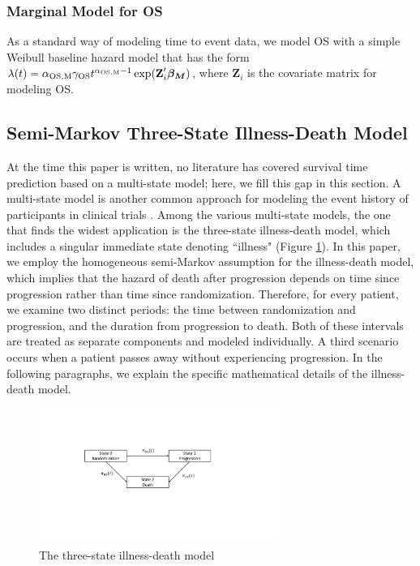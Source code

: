 \subsubsection{Marginal Model for OS} \label{sec:marginal}
As a standard way of modeling time to event data, we model \ac{OS} with a simple Weibull baseline hazard model that has the form
$\lambda(t)=\alpha_{\rm OS,M} \gamma_{\rm OS} t^{\alpha_{\rm OS,M}-1} \exp(\textbf{Z}_i' \boldsymbol{\beta_{M}})$,
where $\textbf{Z}_i$ is the covariate matrix for modeling OS.

\subsection{Semi-Markov Three-State Illness-Death Model}
\label{sec:multi-state}
At the time this paper is written, no literature has covered survival time prediction based on a multi-state model; here, we fill this gap in this section. A multi-state model is another common approach for modeling the event history of participants in clinical trials \citep{andersen2002multi, meira2009multi, putter2007tutorial}. Among the various multi-state models, the one that finds the widest application is the three-state illness-death model, which includes a singular immediate state denoting ``illness" (Figure \ref{fig:multistate}). In this paper, we employ the homogeneous semi-Markov assumption \citep{cox1977theory} for the illness-death model, which implies that the hazard of death after progression depends on time since progression rather than time since randomization. Therefore, for every patient, we examine two distinct periods: the time between randomization and progression, and the duration from progression to death. Both of these intervals are treated as separate components and modeled individually. A third scenario occurs when a patient passes away without experiencing progression. In the following paragraphs, we explain the specific mathematical details of the illness-death model.

\begin{figure}
    \centering
    \includegraphics[width=0.7\textwidth]{chapters/figures/multi-state.pdf}
    \caption{The three-state illness-death model \label{fig:multistate}}
\end{figure}


